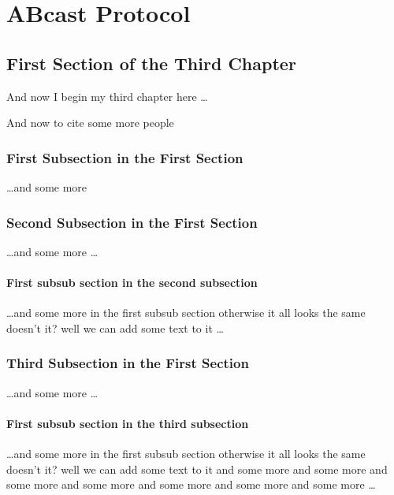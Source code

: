 \chapter{ABcast Protocol}

\ifpdf
    \graphicspath{{Chapter3/Figs/Raster/}{Chapter3/Figs/PDF/}{Chapter3/Figs/}}
\else
    \graphicspath{{Chapter3/Figs/Vector/}{Chapter3/Figs/}}
\fi

\section{First Section of the Third Chapter}
And now I begin my third chapter here \dots

And now to cite some more people~\citet{Rea85,Ancey1996}

\subsection{First Subsection in the First Section}
\dots and some more 

\subsection{Second Subsection in the First Section}
\dots and some more \dots

\subsubsection{First subsub section in the second subsection}
\dots and some more in the first subsub section otherwise it all looks the same
doesn't it? well we can add some text to it \dots

\subsection{Third Subsection in the First Section}
\dots and some more \dots

\subsubsection{First subsub section in the third subsection}
\dots and some more in the first subsub section otherwise it all looks the same
doesn't it? well we can add some text to it and some more and some more and
some more and some more and some more and some more and some more \dots

